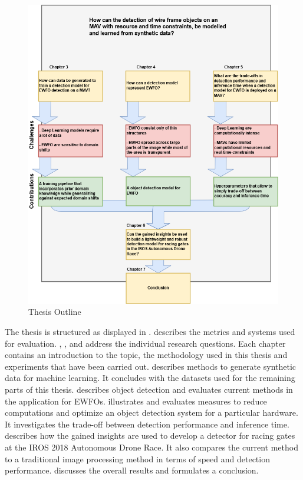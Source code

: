 \begin{figure}[hbtp]
	\centering
	\includegraphics[width=\textwidth]{fig/Outline}
	\caption{Thesis Outline}
	\label{fig:outline}
\end{figure}


The thesis is structured as displayed in .  describes the metrics and systems used for evaluation. , ,  and  address the individual research questions. Each chapter contains an introduction to the topic, the methodology used in this thesis and experiments that have been carried out.  describes methods to generate synthetic data for machine learning. It concludes with the datasets used for the remaining parts of this thesis.   describes object detection and evaluates current methods in the application for \acp{EWFO}.  illustrates and evaluates measures to reduce computations and optimize an object detection system for a particular hardware. It investigates the trade-off between detection performance and inference time.  describes how the gained insights are used to develop a detector for racing gates at the \ac{IROS} 2018 Autonomous Drone Race. It also compares the current method to a traditional image processing method in terms of speed and detection performance.  discusses the overall results and formulates a conclusion.



